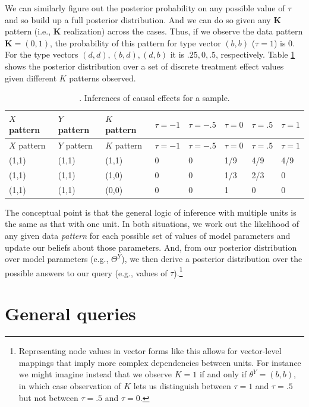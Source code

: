 \documentclass[
  12pt,
]{book}
\begin{document}
We can similarly figure out the posterior probability on any possible value of \(\tau\) and so build up a full posterior distribution. And we can do so given any \(\mathbf K\) pattern (i.e., \(\mathbf K\) realization) across the cases. Thus, if we observe the data pattern \(\mathbf K = (0,1)\), the probability of this pattern for type vector \((b,b)\) (\(\tau = 1\)) is 0. For the type vectors \((d,d), (b, d), (d,b)\) it is \(.25, 0, .5\), respectively. Table \ref{tab:ch9patterns} shows the posterior distribution over a set of discrete treatment effect values given different \(K\) patterns observed.

\begin{longtable}[]{@{}llllllll@{}}
\caption{\label{tab:ch9patterns}. Inferences of causal effects for a sample.}\tabularnewline
\toprule
\(X\) pattern & \(Y\) pattern & \(K\) pattern & \(\tau = -1\) & \(\tau = -.5\) & \(\tau = 0\) & \(\tau = .5\) & \(\tau = 1\) \\
\midrule
\endfirsthead
\toprule
\(X\) pattern & \(Y\) pattern & \(K\) pattern & \(\tau = -1\) & \(\tau = -.5\) & \(\tau = 0\) & \(\tau = .5\) & \(\tau = 1\) \\
\midrule
\endhead
(1,1) & (1,1) & (1,1) & 0 & 0 & 1/9 & 4/9 & 4/9 \\
(1,1) & (1,1) & (1,0) & 0 & 0 & 1/3 & 2/3 & 0 \\
(1,1) & (1,1) & (0,0) & 0 & 0 & 1 & 0 & 0 \\
\bottomrule
\end{longtable}

The conceptual point is that the general logic of inference with multiple units is the same as that with one unit. In both situations, we work out the likelihood of any given data \emph{pattern} for each possible set of values of model parameters and update our beliefs about those parameters. And, from our posterior distribution over model parameters (e.g., \(\Theta^Y\)), we then derive a posterior distribution over the possible answers to our query (e.g., values of \(\tau\)).\footnote{Representing node values in vector forms like this allows for vector-level mappings that imply more complex dependencies between units. For instance we might imagine instead that we observe \(K=1\) if and only if \(\theta^Y = (b,b)\), in which case observation of \(K\) lets us distinguish between \(\tau = 1\) and \(\tau = .5\) but not between \(\tau = .5\) and \(\tau = 0\).}

\hypertarget{general-queries}{%
\section{General queries}\label{general-queries}}
\end{document}
